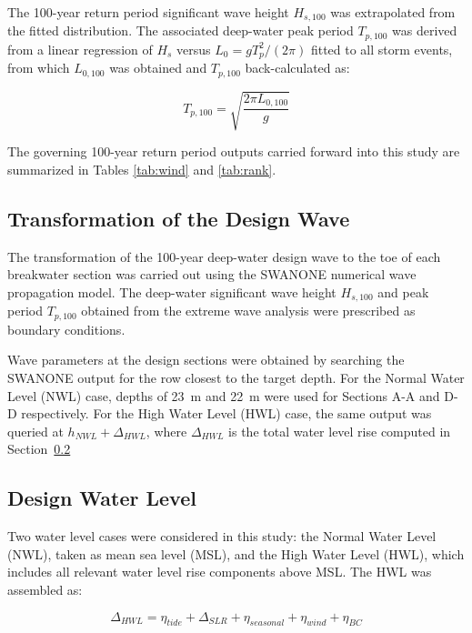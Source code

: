 \documentclass[a4paper, 11pt]{article}
\begin{document}
The 100-year return period significant wave height $H_{s,100}$ was 
extrapolated from the fitted distribution. The associated deep-water 
peak period $T_{p,100}$ was derived from a linear regression of $H_s$ 
versus $L_0 = gT_p^2 / (2\pi)$ fitted to all storm events, from which 
$L_{0,100}$ was obtained and $T_{p,100}$ back-calculated as:

\begin{equation}
    T_{p,100} = \sqrt{\frac{2\pi L_{0,100}}{g}}
\end{equation}

The governing 100-year return period outputs carried forward into this study are summarized in Tables \ref{tab:wind} and \ref{tab:rank}.


\subsection{Transformation of the Design Wave}
\hspace{0.5cm}The transformation of the 100-year deep-water design wave 
to the toe of each breakwater section was carried out using the SWANONE 
numerical wave propagation model. The deep-water significant 
wave height $H_{s,100}$ and peak period $T_{p,100}$ obtained from the 
extreme wave analysis were prescribed as boundary conditions.

Wave parameters at the design sections were obtained by searching the 
SWANONE output for the row closest to the target depth. For the Normal 
Water Level (NWL) case, depths of 23~m and 22~m were used for 
Sections A-A and D-D respectively. For the High Water Level (HWL) 
case, the same output was queried at $h_{NWL} + \Delta_{HWL}$, where 
$\Delta_{HWL}$ is the total water level rise computed in 
Section~\ref{sec:dwl}

\subsection{Design Water Level}
\label{sec:dwl}
\hspace{0.5cm}Two water level cases were considered in this study: 
the Normal Water Level (NWL), taken as mean sea level (MSL), and the 
High Water Level (HWL), which includes all relevant water level rise 
components above MSL. The HWL was assembled as:

\begin{equation}
    \Delta_{HWL} = \eta_{tide} + \Delta_{SLR} + \eta_{seasonal} 
    + \eta_{wind} + \eta_{BC}
\end{equation}
\end{document}
